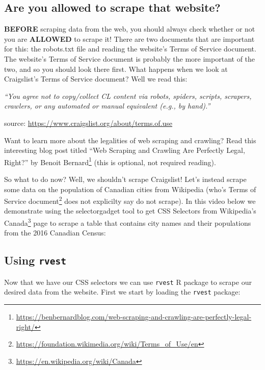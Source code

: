 \documentclass[
]{krantz}
\renewenvironment{quote}{\begin{VF}}{\end{VF}}
\renewcommand{\href}[2]{#2\footnote{\url{#1}}}
\begin{document}
\hypertarget{are-you-allowed-to-scrape-that-website}{%
\subsection{Are you allowed to scrape that website?}\label{are-you-allowed-to-scrape-that-website}}

\textbf{BEFORE} scraping data from the web, you should always check whether or not you are \textbf{ALLOWED} to scrape it! There are two documents that are important for this: the robots.txt file and reading the website's Terms of Service document. The website's Terms of Service document is probably the more important of the two, and so you should look there first. What happens when we look at Craigslist's Terms of Service document? Well we read this:

\emph{``You agree not to copy/collect CL content via robots, spiders, scripts, scrapers, crawlers, or any automated or manual equivalent (e.g., by hand).''}

source: \url{https://www.craigslist.org/about/terms.of.use}

\begin{quote}
Want to learn more about the legalities of web scraping and crawling? Read this interesting blog post titled \href{https://benbernardblog.com/web-scraping-and-crawling-are-perfectly-legal-right/}{``Web Scraping and Crawling Are Perfectly Legal, Right?'' by Benoit Bernard} (this is optional, not required reading).
\end{quote}

So what to do now? Well, we shouldn't scrape Craigslist! Let's instead scrape some data on the population of Canadian cities from Wikipedia (who's \href{https://foundation.wikimedia.org/wiki/Terms_of_Use/en}{Terms of Service document} does not explicilty say do not scrape). In this video below we demonstrate using the selectorgadget tool to get CSS Selectors from \href{https://en.wikipedia.org/wiki/Canada}{Wikipedia's Canada} page to scrape a table that contains city names and their populations from the 2016 Canadian Census:

\hypertarget{using-rvest}{%
\subsection{\texorpdfstring{Using \texttt{rvest}}{Using rvest}}\label{using-rvest}}

Now that we have our CSS selectors we can use \texttt{rvest} R package to scrape our desired data from the website. First we start by loading the \texttt{rvest} package:
\end{document}
